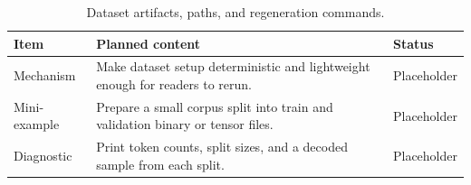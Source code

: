 \begin{table}[H]
\centering
\caption{Dataset artifacts, paths, and regeneration commands.}
\label{tab:ch11-dataset-preparation-and-reproducibility}
\begin{tabularx}{\textwidth}{p{}X p{}}
\toprule
Item & Planned content & Status \\
\midrule
Mechanism & Make dataset setup deterministic and lightweight enough for readers to rerun. & Placeholder \\
Mini-example & Prepare a small corpus split into train and validation binary or tensor files. & Placeholder \\
Diagnostic & Print token counts, split sizes, and a decoded sample from each split. & Placeholder \\
\bottomrule
\end{tabularx}
\end{table}
